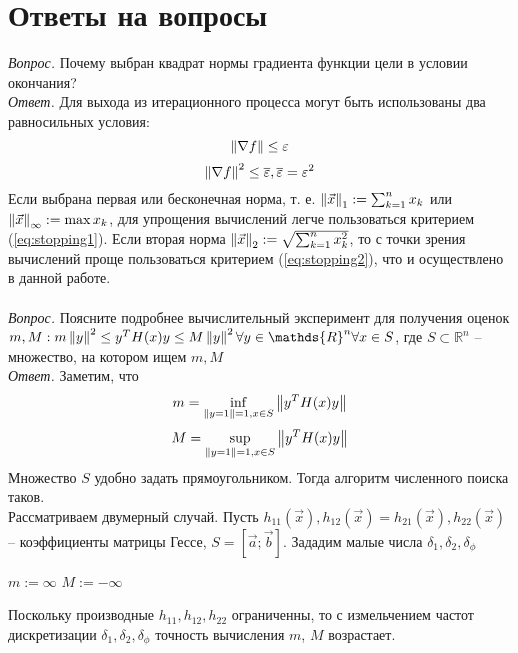 \documentclass[main.tex]{subfiles}
\begin{document}
	\section{Ответы на вопросы}
	\emph{Вопрос.} Почему выбран квадрат нормы градиента функции цели в условии окончания? \\
	\emph{Ответ.} Для выхода из итерационного процесса могут быть использованы два равносильных условия:
	\begin{equation}\label{eq:stopping1}
		\left\lVert\nabla f\right\rVert \le \varepsilon
	\end{equation}
	\begin{equation}\label{eq:stopping2}
		\left\lVert\nabla f\right\rVert^2 \le \overline{\varepsilon}, \overline{\varepsilon} = \varepsilon^2 
	\end{equation}
	Если выбрана первая или бесконечная норма, т. е. $\left\lVert\vec{x}\right\rVert_1 := \sum_{k=1}^{n}x_k$ или $\left\lVert\vec{x}\right\rVert_{\infty} := \max x_k$, для упрощения вычислений легче пользоваться критерием (\ref{eq:stopping1}). Если вторая норма $\left\lVert\vec{x}\right\rVert_2 := \sqrt{\sum_{k=1}^{n}x_k^2}$, то с точки зрения вычислений проще пользоваться критерием (\ref{eq:stopping2}), что и осуществлено в данной работе.\\
	\\
	\emph{Вопрос.} Поясните подробнее вычислительный эксперимент для получения оценок $m, M: m\norm{y}^2 \le y^{T}H(x)y \le M\norm{y}^2 \forall y \in \mathds{R}^n \forall x \in S$, где $S \subset \mathds{R}^n$ -- множество, на котором ищем $m, M$ \\
	\emph{Ответ.} Заметим, что 
	$$m = \inf_{\left\lVert y=1\right\rVert=1, x \in S} \left\lVert y^{T}H(x)y\right\rVert$$
	$$M = \sup_{\left\lVert y=1\right\rVert=1, x \in S} \left\lVert y^{T}H(x)y\right\rVert$$
	Множество $S$ удобно задать прямоугольником. Тогда алгоритм численного поиска таков.\\
	Рассматриваем двумерный случай. Пусть $h_{11}(\vec{x}), h_{12}(\vec{x}) = h_{21}(\vec{x}), h_{22}(\vec{x})$ -- коэффициенты матрицы Гессе, $S=[\vec{a};\vec{b}]$. Зададим малые числа $\delta_1, \delta_2, \delta_\phi$\\
	\begin{algorithm}[H]\label{gradient}
		$m := \infty$\;
		$M := -\infty$\;
	\end{algorithm}
	Поскольку производные $h_{11}, h_{12}, h_{22}$ ограниченны, то с измельчением частот дискретизации $\delta_1, \delta_2, \delta_\phi$ точность вычисления $m$, $M$ возрастает.
\end{document}
